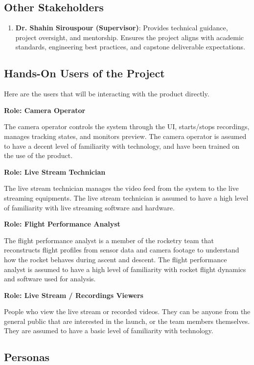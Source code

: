 \documentclass[12pt]{article}
\begin{document}
\subsection{Other Stakeholders}


\begin{enumerate}
  \item \textbf{Dr. Shahin Sirouspour (Supervisor)}: Provides
        technical guidance, project oversight, and mentorship. Ensures
        the project aligns with academic standards, engineering best
        practices, and capstone deliverable expectations.
\end{enumerate}

\subsection{Hands-On Users of the Project}

Here are the users that will be interacting with the product directly.

\textbf{Role: Camera Operator}

The camera operator controls the system through the UI, starts/stops
recordings, manages tracking states, and monitors preview. The camera operator
is assumed to have a decent level of familiarity with technology, and have been
trained on the use of the product.

\textbf{Role: Live Stream Technician}

The live stream technician manages the video feed from the system to the live
streaming equipments. The live stream technician is assumed to have a high
level of familiarity with live streaming software and hardware.

\textbf{Role: Flight Performance Analyst}

The flight performance analyst is a member of the rocketry team that
reconstructs flight profiles from sensor data and camera footage to understand
how the rocket behaves during ascent and descent. The flight performance
analyst is assumed to have a high level of familiarity with rocket flight
dynamics and software used for analysis.

\textbf{Role: Live Stream / Recordings Viewers}

People who view the live stream or recorded videos. They can be anyone from the
general public that are interested in the launch, or the team members
themselves. They are assumed to have a basic level of familiarity with
technology.

\subsection{Personas}
\end{document}
